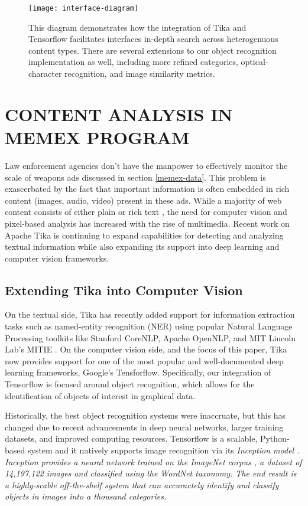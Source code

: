 \begin{figure*}
	\texttt{[image: interface-diagram]}
	\caption{This diagram demonstrates how the integration of Tika and Tensorflow facilitates interfaces in-depth search across heterogenuous content types. There are several extensions to our object recognition implementation as well, including more refined categories, optical-character recognition, and image similarity metrics.}
	\label{fig:interface-diagram}
\end{figure*}

\section{CONTENT ANALYSIS IN MEMEX PROGRAM} \label{sec:memex}
Law enforcement agencies don't have the manpower to effectively monitor the scale of weapons ads discussed in section \ref{memex-data}. This problem is exascerbated by the fact that important information is often embedded in rich content (images, audio, video) present in these ads. While a majority of web content consists of either plain or rich text \cite{mphillips-EOT2012}, the need for computer vision and pixel-based analysis has increased with the rise of multimedia. Recent work on Apache Tika is continuing to expand capabilities for detecting and analyzing textual information while also expanding its support into deep learning and computer vision frameworks. 

\subsection{Extending Tika into Computer Vision}

On the textual side, Tika has recently added support for information extraction tasks such as named-entity recognition (NER) using popular Natural Language Processing toolkits like Stanford CoreNLP\cite{Finkel:2005:INI:1219840.1219885}, Apache OpenNLP\cite{ApacheOpenNLP}, and MIT Lincoln Lab's MITIE \cite{MITIE-github}. On the computer vision side, and the focus of this paper, Tika now provides support for one of the most popular and well-documented deep learning frameworks, Google's Tensforflow. Specifically, our integration of Tensorflow is focused around object recognition, which allows for the identification of objects of interest in graphical data. 

Historically, the best object recognition systems were inaccruate, but this has changed due to recent advancements in deep neural networks, larger training datasets, and improved computing resources. Tensorflow is a scalable, Python-based system and it natively supports image recognition via its \em {Inception} model \cite{abadi2016tensorflow}. \em{Inception} provides a neural network trained on the ImageNet corpus \cite{krizhevsky2012imagenet}, a dataset of 14,197,122 images and classified using the WordNet taxonomy. The end result is a highly-scable off-the-shelf system that can accuractely identify and classify objects in images into a thousand categories. 

